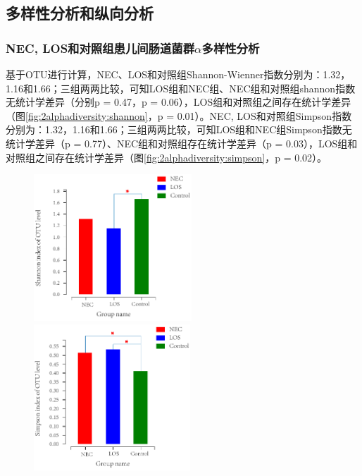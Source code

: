 {{  %
  \subsection{多样性分析和纵向分析}
    \subsubsection{NEC, LOS和对照组患儿间肠道菌群$\alpha$多样性分析}
      基于OTU进行计算，NEC、LOS和对照组Shannon-Wienner指数分别为：1.32，1.16和1.66；三组两两比较，可知LOS组和NEC组、NEC组和对照组shannon指数无统计学差异（分别p = 0.47，p = 0.06），LOS组和对照组之间存在统计学差异（图\ref{fig:2alphadiversity:shannon}，p = 0.01）。NEC, LOS和对照组Simpson指数分别为：1.32，1.16和1.66；三组两两比较，可知LOS组和NEC组Simpson指数无统计学差异（p = 0.77）、NEC组和对照组存在统计学差异（p = 0.03），LOS组和对照组之间存在统计学差异（图\ref{fig:2alphadiversity:simpson}，p = 0.02）。
      \begin{figure}[!htp]
        \centering
            {\includegraphics[height=5.5cm]{figure/2shannon.pdf}}
            \hspace{4em}
            {\includegraphics[height=5.5cm]{figure/2simpson.pdf}}
        \label{fig:2alphadiversity}
      \end{figure}
}}
